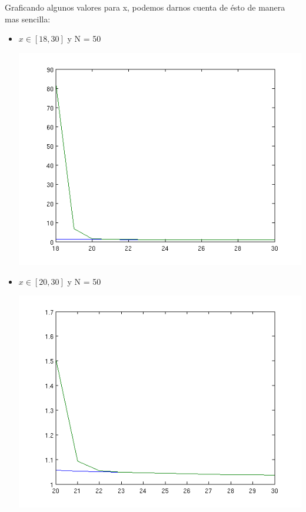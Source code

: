 Graficando algunos valores para x, podemos darnos cuenta de ésto de manera mas sencilla:

\begin{itemize}

\item $x \in [18,30]$ y N = 50

\begin{center}
\includegraphics[scale=0.5]{images/2a.png}
\end{center}

\item $x \in [20,30]$ y N = 50


\begin{center}
\includegraphics[scale=0.5]{images/2b.png}
\end{center}


\end{itemize}
